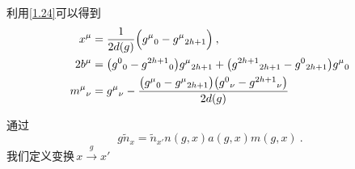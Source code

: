 利用\eqref{1.24}可以得到
\begin{subequations}
    \begin{align}
        x^{\mu}&=\frac{1}{2d(g)}\Bigl(g^{\mu}{}_{0}-g^{\mu}{}_{2h+1}\Bigr) \:, \\
        2b^{\mu}&=\bigl(g^{0}{}_{0}-g^{2h+1}{}_{0}\bigr)g^{\mu}{}_{2h+1}+
        \bigl(g^{2h+1}{}_{2h+1}-g^{0}{}_{2h+1}\bigr)g^{\mu}{}_{0} \\
        m^{\mu}{}_{\nu}&=g^{\mu}{}_{\nu}-\frac{\bigl(g^{\mu}{}_{0}-g^{\mu}{}_{2h+1}\bigr)\bigl(g^{0}{}_{\nu}-g^{2h+1}{}_{\nu}\bigr)}{2d(g)}
    \end{align} \label{1.26}
\end{subequations}

通过
\begin{equation}
    g\tilde{n}_{x} =\tilde{n}_{x'} n(g,x)a(g,x)m(g,x) \:. \label{1.27}
\end{equation}
我们定义变换$\,x\xrightarrow[]{g}x'$
